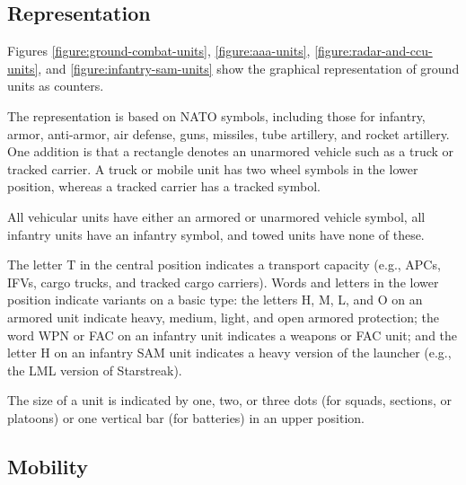 \documentclass[10pt]{article}
\begin{document}
\subsection{Representation}

Figures \ref{figure:ground-combat-units}, \ref{figure:aaa-units}, \ref{figure:radar-and-ccu-units}, and \ref{figure:infantry-sam-units} show the graphical representation of ground units as counters.

The representation is based on NATO symbols, including those for infantry, armor, anti-armor, air defense, guns, missiles, tube artillery, and rocket artillery. One addition is that a rectangle denotes an unarmored vehicle such as a truck or tracked carrier. A truck or mobile unit has two wheel symbols in the lower position, whereas a tracked carrier has a tracked symbol.

All vehicular units have either an armored or unarmored vehicle symbol, all infantry units have an infantry symbol, and towed units have none of these.

The letter T in the central position indicates a transport capacity (e.g., APCs, IFVs, cargo trucks, and tracked cargo carriers). Words and letters in the lower position indicate variants on a basic type: the letters H, M, L, and O on an armored unit indicate heavy, medium, light, and open armored protection; the word WPN or FAC on an infantry unit indicates a weapons or FAC unit; and the letter H on an infantry SAM unit indicates a heavy version of the launcher (e.g., the LML version of Starstreak).

The size of a unit is indicated by one, two, or three dots (for squads, sections, or platoons) or one vertical bar (for batteries) in an upper position.

\subsection{Mobility}
\end{document}
